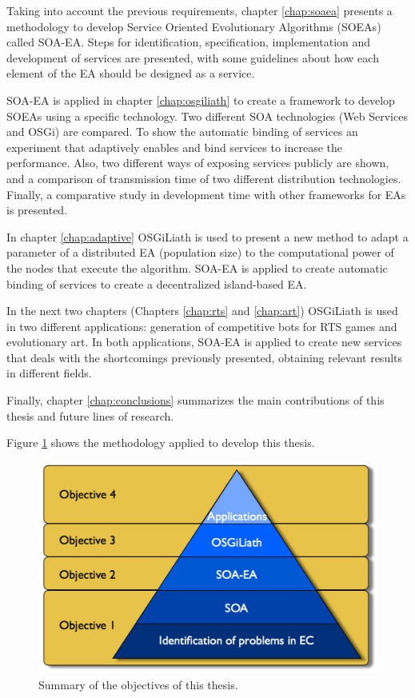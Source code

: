 Taking into account the previous requirements, chapter \ref{chap:soaea} presents a methodology to develop Service Oriented Evolutionary Algorithms (SOEAs) called SOA-EA. Steps for identification, specification, implementation and development of services are presented, with some guidelines about how each element of the EA should be designed as a service.

SOA-EA is applied in chapter \ref{chap:osgiliath} to create a framework to develop SOEAs using a specific technology. Two different SOA technologies (Web Services and OSGi) are compared. To show the automatic binding of services an experiment that adaptively enables and bind services to increase the performance. Also, two different ways of exposing services publicly are shown, and a comparison of transmission time of two different distribution technologies. Finally, a comparative study in development time with other frameworks for EAs is presented.

In chapter \ref{chap:adaptive} OSGiLiath is used to present a new method to adapt a parameter of a distributed EA (population size) to the computational power of the nodes that execute the algorithm. SOA-EA is applied to create automatic binding of services to create a decentralized island-based EA.

In the next two chapters (Chapters \ref{chap:rts} and \ref{chap:art}) OSGiLiath is used in two different applications: generation of competitive bots for RTS games and evolutionary art. In both applications, SOA-EA is applied to create new services that deals with the shortcomings previously presented, obtaining relevant results in different fields.

Finally, chapter \ref{chap:conclusions} summarizes the main contributions of this thesis and future lines of research.

Figure \ref{fig:intro:piramid} shows the methodology applied to develop this thesis.

\begin{figure}
\centering
 \includegraphics[scale =0.3] {gfx/intro/tesispiramide.pdf}
\caption{Summary of the objectives of this thesis.}
\label{fig:intro:piramid}
\end{figure}

